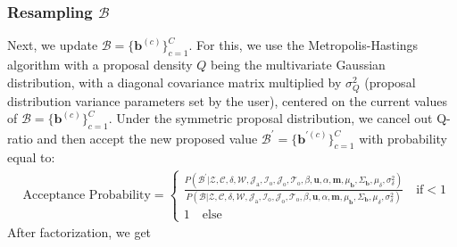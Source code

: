 \documentclass[a4paper]{article}
\begin{document}
   \subsubsection{Resampling $\mathcal{B}$ }  \label{subsec: Resampling B}
   Next, we update $\mathcal{B}=\{\boldsymbol{b}^{(c)}\}_{c=1}^C$. For this, we use the Metropolis-Hastings algorithm with a proposal density $Q$ being the multivariate Gaussian distribution, with a diagonal covariance matrix multiplied by $\sigma^2_Q$ (proposal distribution variance parameters set by the user), centered on the current values of $\mathcal{B}=\{\boldsymbol{b}^{(c)}\}_{c=1}^C$. Under the symmetric proposal distribution, we cancel out Q-ratio and then accept the new proposed value $\mathcal{B}^\prime=\{\boldsymbol{b}^{\prime(c)}\}_{c=1}^C$ with probability equal to:
   \begin{equation}
   \begin{split}
   & \mbox{Acceptance Probability}=
   \begin{cases}  \frac{P(\mathcal{B}^\prime|\mathcal{Z},   \mathcal{C}, \delta, \mathcal{W},  \mathcal{J}_{\mbox{a}}, \mathcal{I}_{\mbox{o}}, \mathcal{J}_{\mbox{o}}, \mathcal{T}_{\mbox{o}}, \beta, \boldsymbol{u}, \alpha, \boldsymbol{m},\mu_{\boldsymbol{b}}, \Sigma_{\boldsymbol{b}}, \mu_\delta, \sigma^2_\delta)}{P(\mathcal{B}|\mathcal{Z},   \mathcal{C}, \delta, \mathcal{W}, \mathcal{J}_{\mbox{a}}, \mathcal{I}_{\mbox{o}}, \mathcal{J}_{\mbox{o}}, \mathcal{T}_{\mbox{o}}, \beta, \boldsymbol{u}, \alpha, \boldsymbol{m}, \mu_{\boldsymbol{b}}, \Sigma_{\boldsymbol{b}}, \mu_\delta, \sigma^2_\delta)}\quad\text{if}  <1\\
   1 \quad \text{else}
   \end{cases}
   \end{split}
   \end{equation}
   After factorization, we get
\end{document}

